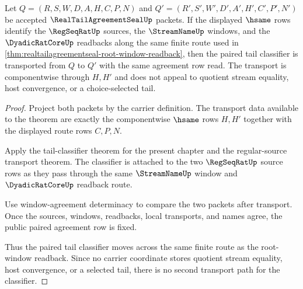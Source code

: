 \begin{theorem}
\label{thm:realtailagreementseal-tail-classifier-transport}
Let $Q=(R,S,W,D,A,H,C,P,N)$ and $Q'=(R',S',W',D',A',H',C',P',N')$ be accepted $\RealTailAgreementSealUp$ packets. If the displayed $\hsame$ rows identify the $\RegSeqRatUp$ sources, the $\StreamNameUp$ windows, and the $\DyadicRatCoreUp$ readbacks along the same finite route used in \autoref{thm:realtailagreementseal-root-window-readback}, then the paired tail classifier is transported from $Q$ to $Q'$ with the same agreement row read. The transport is componentwise through $H,H'$ and does not appeal to quotient stream equality, host convergence, or a choice-selected tail.
\end{theorem}
\begin{proof}
Project both packets by the carrier definition. The transport data available to the theorem are exactly the componentwise $\hsame$ rows $H,H'$ together with the displayed route rows $C,P,N$.

Apply the tail-classifier theorem for the present chapter and the regular-source transport theorem. The classifier is attached to the two $\RegSeqRatUp$ source rows as they pass through the same $\StreamNameUp$ window and $\DyadicRatCoreUp$ readback route.

Use window-agreement determinacy to compare the two packets after transport. Once the sources, windows, readbacks, local transports, and names agree, the public paired agreement row is fixed.

Thus the paired tail classifier moves across the same finite route as the root-window readback. Since no carrier coordinate stores quotient stream equality, host convergence, or a selected tail, there is no second transport path for the classifier.
\end{proof}

